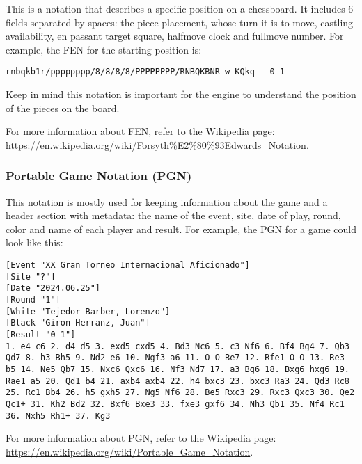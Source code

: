 This is a notation that describes a specific position on a chessboard. It includes 6 fields separated by spaces: the piece placement, whose turn it is to move, castling availability, en passant target square, halfmove clock and fullmove number.
For example, the FEN for the starting position is:
\begin{verbatim}
rnbqkb1r/pppppppp/8/8/8/8/PPPPPPPP/RNBQKBNR w KQkq - 0 1
\end{verbatim}

\vspace{1em}

Keep in mind this notation is important for the engine to understand the position of the pieces on the board.

\vspace{1em}

For more information about FEN, refer to the Wikipedia page: \url{https://en.wikipedia.org/wiki/Forsyth%E2%80%93Edwards_Notation}.

\subsubsection{Portable Game Notation (PGN)}

This notation is mostly used for keeping information about the game and a header section with metadata: the name of the event, site, date of play, round, color and name of each player and result. For example, the PGN for a game could look like this:

\begin{lstlisting}[basicstyle=\ttfamily\small, breaklines=true, frame=single, caption={Example of a PGN file}, label={lst:pgn-example}]
[Event "XX Gran Torneo Internacional Aficionado"]
[Site "?"]
[Date "2024.06.25"]
[Round "1"]
[White "Tejedor Barber, Lorenzo"]
[Black "Giron Herranz, Juan"]
[Result "0-1"]
1. e4 c6 2. d4 d5 3. exd5 cxd5 4. Bd3 Nc6 5. c3 Nf6 6. Bf4 Bg4 7. Qb3 Qd7 8. h3 Bh5 9. Nd2 e6 10. Ngf3 a6 11. O-O Be7 12. Rfe1 O-O 13. Re3 b5 14. Ne5 Qb7 15. Nxc6 Qxc6 16. Nf3 Nd7 17. a3 Bg6 18. Bxg6 hxg6 19. Rae1 a5 20. Qd1 b4 21. axb4 axb4 22. h4 bxc3 23. bxc3 Ra3 24. Qd3 Rc8 25. Rc1 Bb4 26. h5 gxh5 27. Ng5 Nf6 28. Be5 Rxc3 29. Rxc3 Qxc3 30. Qe2 Qc1+ 31. Kh2 Bd2 32. Bxf6 Bxe3 33. fxe3 gxf6 34. Nh3 Qb1 35. Nf4 Rc1 36. Nxh5 Rh1+ 37. Kg3
\end{lstlisting}

For more information about PGN, refer to the Wikipedia page: \url{https://en.wikipedia.org/wiki/Portable_Game_Notation}.

